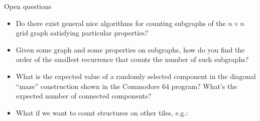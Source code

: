 \documentclass{beamer}%
\begin{document}
\begin{frame}{Open questions}
  \begin{itemize}
    \item Do there exist general nice algorithms for counting subgraphs of the
      $n \times n$ grid graph satisfying particular properties?
    \item Given some graph and some properties on subgraphs, how do you find
      the order of the smallest recurrence that counts the number of such
      subgraphs?
    \item What is the expected value of a randomly selected component in the
    diagonal ``maze'' construction shown in the Commodore 64 program?
    What's the expected number of connected components?
    \item What if we want to count structures on other tiles, e.g.:
      
  \end{itemize}
\end{frame}
\end{document}
